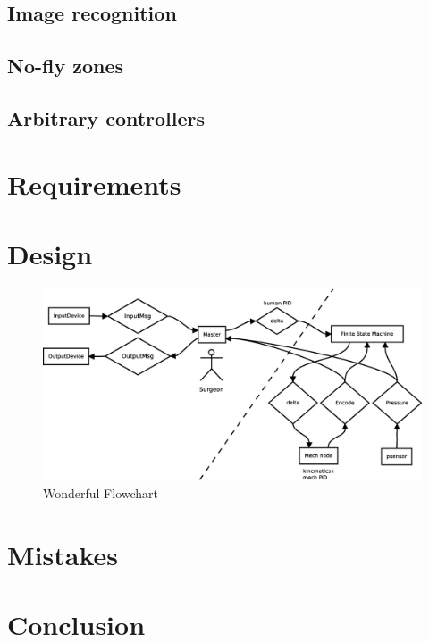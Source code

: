 \documentclass[letterpaper,twocolumn,10pt]{article}
\begin{document}
\subsection{Image recognition}

\subsection{No-fly zones}

\subsection{Arbitrary controllers}

\section{Requirements}

\section{Design}

\begin{figure}[t]
\begin{center}
\includegraphics[width=1.0\textwidth]{ros_high_level_v2.eps}
\end{center}
\caption{Wonderful Flowchart}
\end{figure}

\section{Mistakes}

\section{Conclusion}



\end{document}
